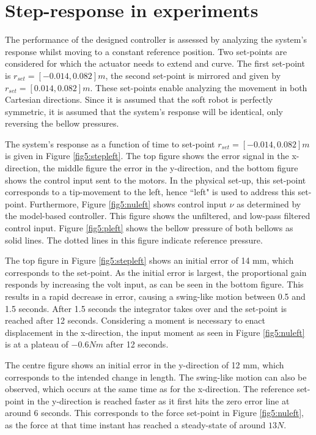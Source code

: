\section{Step-response in experiments}


The performance of the designed controller is assessed by analyzing the system's response whilst moving to a constant reference position. Two set-points are considered for which the actuator needs to extend and curve. The first set-point is $r_{set} = [-0.014,0.082] m$, the second set-point is mirrored and given by $r_{set} = [0.014,0.082] m$. These set-points enable analyzing the movement in both Cartesian directions. Since it is assumed that the soft robot is perfectly symmetric, it is assumed that the system's response will be identical, only reversing the bellow pressures. 

The system's response as a function of time to set-point $r_{set} = [-0.014,0.082] m$ is given in Figure \ref{fig5:stepleft}. The top figure shows the error signal in the x-direction, the middle figure the error in the y-direction, and the bottom figure shows the control input sent to the motors. In the physical set-up, this set-point corresponds to a tip-movement to the left, hence ``left"  is used to address this set-point. Furthermore, Figure \ref{fig5:nuleft} shows control input $\nu$ as determined by the model-based controller. This figure shows the unfiltered, and low-pass filtered control input. Figure \ref{fig5:pleft} shows the bellow pressure of both bellows as solid lines. The dotted lines in this figure indicate reference pressure.


The top figure in Figure \ref{fig5:stepleft} shows an initial error of 14 mm, which corresponds to the set-point. As the initial error is largest, the proportional gain responds by increasing the volt input, as can be seen in the bottom figure. This results in a rapid decrease in error, causing a swing-like motion between 0.5 and 1.5 seconds. After 1.5 seconds the integrator takes over and the set-point is reached after 12 seconds. Considering a moment is necessary to enact displacement in the x-direction, the input moment as seen in Figure \ref{fig5:nuleft} is at a plateau of $-0.6 Nm$ after 12 seconds. 

The centre figure shows an initial error in the y-direction of 12 mm, which corresponds to the intended change in length. The swing-like motion can also be observed, which occurs at the same time as for the x-direction. The reference set-point in the y-direction is reached faster as it first hits the zero error line at around 6 seconds. This corresponds to the force set-point in Figure \ref{fig5:nuleft}, as the force at that time instant has reached a steady-state of around $13N$. 

